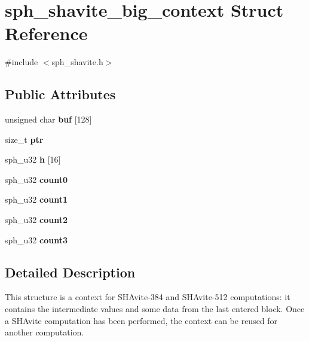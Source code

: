 \hypertarget{structsph__shavite__big__context}{}\section{sph\+\_\+shavite\+\_\+big\+\_\+context Struct Reference}
\label{structsph__shavite__big__context}


{\ttfamily \#include $<$sph\+\_\+shavite.\+h$>$}

\subsection*{Public Attributes}
\begin{DoxyCompactItemize}
\item 
\mbox{\label{structsph__shavite__big__context_a8de5b007c608c41a1f10ccc5e62c71d3}} 
unsigned char {\bfseries buf} \mbox{[}128\mbox{]}
\item 
\mbox{\label{structsph__shavite__big__context_ad70355ab4dd9a6f80191802977897a70}} 
size\+\_\+t {\bfseries ptr}
\item 
\mbox{\label{structsph__shavite__big__context_af2b5cda92791e0180ccca0108cbcdc40}} 
sph\+\_\+u32 {\bfseries h} \mbox{[}16\mbox{]}
\item 
\mbox{\label{structsph__shavite__big__context_afecac1e6c2afed7a9a43bf146f74480d}} 
sph\+\_\+u32 {\bfseries count0}
\item 
\mbox{\label{structsph__shavite__big__context_a456e003be27a3f6e27b467e0f8f69b41}} 
sph\+\_\+u32 {\bfseries count1}
\item 
\mbox{\label{structsph__shavite__big__context_a80e43e7ce1fa3ae38d77c8416aedd787}} 
sph\+\_\+u32 {\bfseries count2}
\item 
\mbox{\label{structsph__shavite__big__context_ae4e9d166fd7a40f1a1a43d4861779b9a}} 
sph\+\_\+u32 {\bfseries count3}
\end{DoxyCompactItemize}


\subsection{Detailed Description}
This structure is a context for S\+H\+Avite-\/384 and S\+H\+Avite-\/512 computations\+: it contains the intermediate values and some data from the last entered block. Once a S\+H\+Avite computation has been performed, the context can be reused for another computation.

